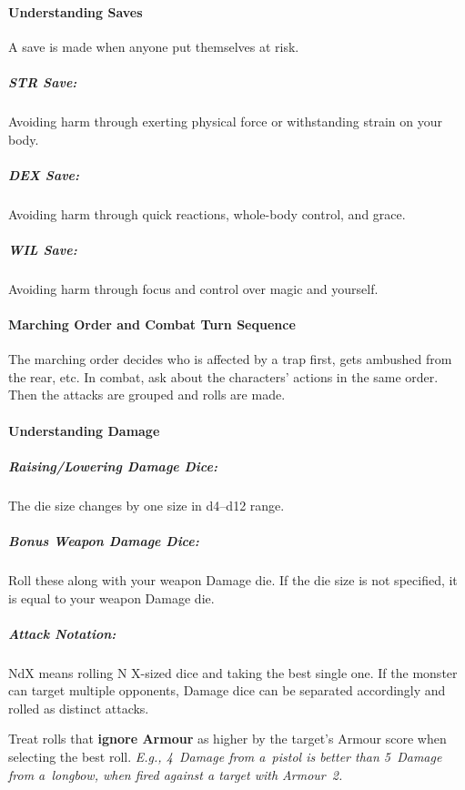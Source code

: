 \documentclass[itdr/core]{subfiles}
\begin{document}

\paragraph{Understanding Saves}
A save is made when anyone put themselves at risk.

\subparagraph{STR Save:} Avoiding harm through exerting physical force or withstanding strain on your body.

\subparagraph{DEX Save:} Avoiding harm through quick reactions, whole-body control, and grace.

\subparagraph{WIL Save:} Avoiding harm through focus and control over magic and yourself.


\paragraph{Marching Order and Combat Turn Sequence}
The marching order decides who is affected by a trap first, gets ambushed from the rear, etc. In combat, ask about the characters' actions in the same order. Then the attacks are grouped and rolls are made.

\enlargethispage{\baselineskip}
\break

\paragraph{Understanding Damage}
\subparagraph{Raising/Lowering Damage Dice:} The die size changes by one size in d4--d12 range.

\subparagraph{Bonus Weapon Damage Dice:} Roll these along with your weapon Damage die. If the die size is not \mbox{specified}, it is equal to your weapon Damage die.

\subparagraph{Attack Notation:} NdX means rolling N X-sized dice and taking the best single one. If the monster can target multiple opponents, Damage dice can be separated accordingly and rolled as distinct attacks.

Treat rolls that \textbf{ignore Armour} as higher by the target's Armour score when selecting the best roll.
{\em E.g., 4~Damage from a~pistol is better than 5~Damage from a~longbow, when fired against a target with Armour~2.}
\end{document}
